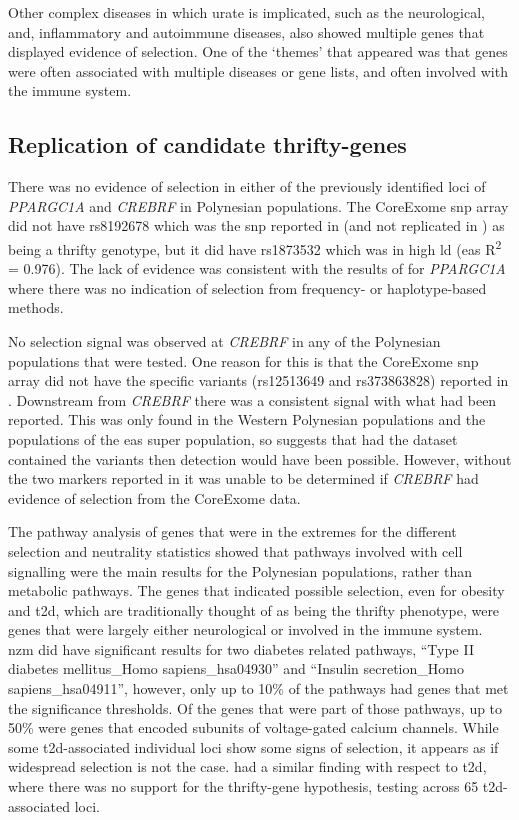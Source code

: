 \documentclass[]{report}
\begin{document}
Other complex diseases in which urate is implicated, such as the
neurological, and, inflammatory and autoimmune diseases, also showed
multiple genes that displayed evidence of selection. One of the `themes'
that appeared was that genes were often associated with multiple
diseases or gene lists, and often involved with the immune system.

\subsection{Replication of candidate
thrifty-genes}\label{replication-of-candidate-thrifty-genes}

There was no evidence of selection in either of the previously
identified loci of \emph{PPARGC1A} and \emph{CREBRF} in Polynesian
populations. The CoreExome \gls{snp} array did not have rs8192678 which
was the \gls{snp} reported in \citet{Myles2011} (and not replicated in
\citet{Cadzow2016}) as being a thrifty genotype, but it did have
rs1873532 which was in high \gls{ld} (\gls{eas} R\textsuperscript{2} =
0.976). The lack of evidence was consistent with the results of
\citet{Cadzow2016} for \emph{PPARGC1A} where there was no indication of
selection from frequency- or haplotype-based methods.

No selection signal was observed at \emph{CREBRF} in any of the
Polynesian populations that were tested. One reason for this is that the
CoreExome \gls{snp} array did not have the specific variants (rs12513649
and rs373863828) reported in \citet{Minster2016}. Downstream from
\emph{CREBRF} there was a consistent signal with what had been reported.
This was only found in the Western Polynesian populations and the
populations of the \gls{eas} super population, so suggests that had the
dataset contained the variants then detection would have been possible.
However, without the two markers reported in \citet{Minster2016} it was
unable to be determined if \emph{CREBRF} had evidence of selection from
the CoreExome data.

The pathway analysis of genes that were in the extremes for the
different selection and neutrality statistics showed that pathways
involved with cell signalling were the main results for the Polynesian
populations, rather than metabolic pathways. The genes that indicated
possible selection, even for obesity and \gls{t2d}, which are
traditionally thought of as being the thrifty phenotype, were genes that
were largely either neurological or involved in the immune system.
\gls{nzm} did have significant results for two diabetes related
pathways, ``Type II diabetes mellitus\_Homo sapiens\_hsa04930'' and
``Insulin secretion\_Homo sapiens\_hsa04911'', however, only up to 10\%
of the pathways had genes that met the significance thresholds. Of the
genes that were part of those pathways, up to 50\% were genes that
encoded subunits of voltage-gated calcium channels. While some
\gls{t2d}-associated individual loci show some signs of selection, it
appears as if widespread selection is not the case. \citet{Ayub2014c}
had a similar finding with respect to \gls{t2d}, where there was no
support for the thrifty-gene hypothesis, testing across 65
\gls{t2d}-associated loci.
\end{document}
